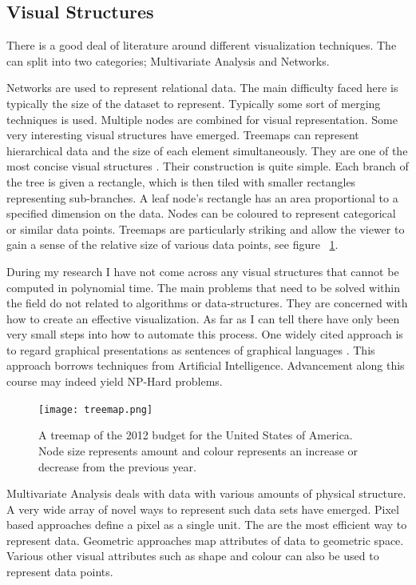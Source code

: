 \documentclass[a4paper, 10pt, titlepage, twocolumn, onehalfspace]{article}
\begin{document}
\subsection{Visual Structures}
There is a good deal of literature around different visualization techniques. The can split into two categories; Multivariate Analysis and Networks.

Networks are used to represent relational data. The main difficulty faced here is typically the size of the dataset to represent. Typically some sort of merging techniques is used. Multiple nodes are combined for visual representation. Some very interesting visual structures have emerged. Treemaps can represent hierarchical data and the size of each element simultaneously. They are one of the most concise visual structures \cite{shneiderman2001ordered}. Their construction is quite simple. Each branch of the tree is given a rectangle, which is then tiled with smaller rectangles representing sub-branches. A leaf node's rectangle has an area proportional to a specified dimension on the data. Nodes can be coloured to represent categorical or similar data points. Treemaps are particularly striking and allow the viewer to gain a sense of the relative size of various data points, see figure ~\ref{fig:treemap}. 

During my research I have not come across any visual structures that cannot be computed in polynomial time. The main problems that need to be solved within the field do not related to algorithms or data-structures. They are concerned with how to create an effective visualization. As far as I can tell there have only been very small steps into how to automate this process. One widely cited approach is to regard graphical presentations as sentences of graphical languages \cite{mackinlay1986automating}. This approach borrows techniques from Artificial Intelligence. Advancement along this course may indeed yield NP-Hard problems.
\begin{figure}[hbt]
  \begin{center}
    \texttt{[image: treemap.png]}
  \end{center}
  \caption{\small A treemap of the 2012 budget for the United States of America. Node size represents amount and colour represents an increase or decrease from the previous year.}
  \label{fig:treemap}
\end{figure}
Multivariate Analysis deals with data with various amounts of physical structure. A very wide array of novel ways to represent such data sets have emerged. Pixel based approaches define a pixel as a single unit. The are the most efficient way to represent data. Geometric approaches map attributes of data to geometric space. Various other visual attributes such as shape and colour can also be used to represent data points.
\end{document}
